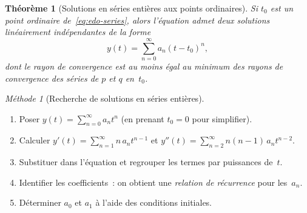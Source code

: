 \documentclass[12pt,a4paper,openany]{book}
\theoremstyle{definition}
\theoremstyle{plain}
\newtheorem{theoreme}[definition]{Théorème}
\theoremstyle{remark}
\newtheorem{methode}[definition]{Méthode}
\begin{document}
\begin{theoreme}[Solutions en séries entières aux points ordinaires]\label{thm:series-point-ord}
  Si $t_0$ est un point ordinaire de~\eqref{eq:edo-series}, alors
  l'équation admet deux solutions linéairement indépendantes de la forme
  \[
    y(t) = \sum_{n=0}^{\infty} a_n (t - t_0)^n,
  \]
  dont le rayon de convergence est au moins égal au minimum des rayons
  de convergence des séries de $p$ et $q$ en~$t_0$.
\end{theoreme}

\begin{methode}[Recherche de solutions en séries entières]\label{meth:series}
  \begin{enumerate}
    \item Poser $y(t) = \sum_{n=0}^\infty a_n t^n$ (en prenant $t_0 = 0$
      pour simplifier).
    \item Calculer $y'(t) = \sum_{n=1}^\infty n\,a_n t^{n-1}$ et
      $y''(t) = \sum_{n=2}^\infty n(n-1)\,a_n t^{n-2}$.
    \item Substituer dans l'équation et regrouper les termes par
      puissances de~$t$.
    \item Identifier les coefficients~: on obtient une \emph{relation
      de récurrence} pour les~$a_n$.
    \item Déterminer $a_0$ et $a_1$ à l'aide des conditions initiales.
  \end{enumerate}
\end{methode}
\end{document}
